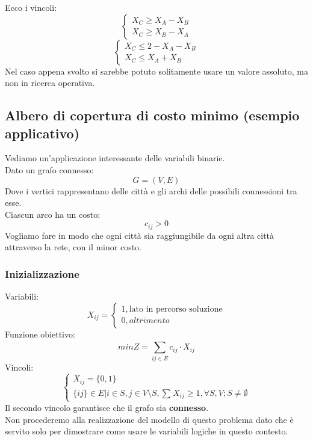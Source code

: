 \documentclass[12pt,a4paper]{article}
\begin{document}
Ecco i vincoli:
\[
\begin{cases}
    X_C \geq X_A - X_B\\
    X_C \geq X_B - X_A
\end{cases}
\]
\[
\begin{cases}
    X_C \leq 2 - X_A - X_B\\
    X_C \leq X_A + X_B
\end{cases}
\]
Nel caso appena svolto si sarebbe potuto solitamente usare un valore assoluto, ma non in ricerca operativa.
\subsection{Albero di copertura di costo minimo (esempio applicativo)}
Vediamo un'applicazione interessante delle variabili binarie.\\
Dato un grafo connesso:
\[
G = (V,E)
\]
Dove i vertici rappresentano delle città e gli archi delle possibili connessioni tra esse.\\
Ciascun arco ha un costo:
\[
c_{ij} > 0
\]
Vogliamo fare in modo che ogni città sia raggiungibile da ogni altra città attraverso la rete, con il minor costo.\\
\subsubsection{Inizializzazione}
Variabili:
\[
X_{ij} = \begin{cases}
    1, \text{lato in percorso soluzione}\\
    0, altrimento
\end{cases}
\]
Funzione obiettivo:
\[
minZ = \sum_{ij \in E}^{}c_{ij} \cdot X_{ij}
\]
Vincoli:
\[
\begin{cases}
    X_{ij} = \{0,1\}\\
    \{ij\} \in E | i \in S, j \in V \setminus S, \sum_{}^{} X_{ij} \geq 1, \forall S,V; S \ne \emptyset
\end{cases}
\]
Il secondo vincolo garantisce che il grafo sia \textbf{connesso}.\\
Non procederemo alla realizzazione del modello di questo problema dato che è servito solo per dimostrare come usare le variabili logiche in questo contesto.\\\\
\end{document}
